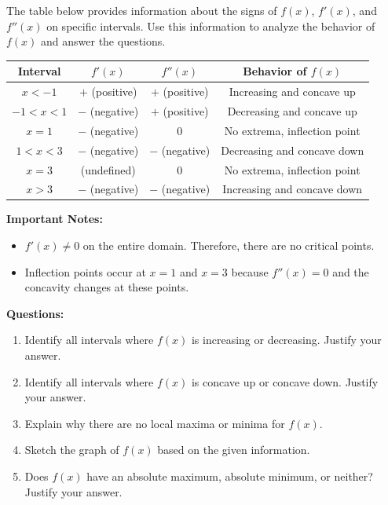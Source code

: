 \documentclass{article}
\begin{document}
\begin{tcolorbox}[colback=blue!10, colframe=blue!50!black, title=AP Calculus Problem]
The table below provides information about the signs of \(f(x)\), \(f'(x)\), and \(f''(x)\) on specific intervals. Use this information to analyze the behavior of \(f(x)\) and answer the questions.

\begin{center}
\begin{tabular}{|c|c|c|c|}
\hline
Interval & \(f'(x)\) & \(f''(x)\) & Behavior of \(f(x)\) \\
\hline
\(x < -1\) & \(+\) (positive) & \(+\) (positive) & Increasing and concave up \\
\(-1 < x < 1\) & \(-\) (negative) & \(+\) (positive) & Decreasing and concave up \\
\(x = 1\) & \(-\) (negative) & \(0\) & No extrema, inflection point \\
\(1 < x < 3\) & \(-\) (negative) & \(-\) (negative) & Decreasing and concave down \\
\(x = 3\) &  (undefined) & \(0\) & No extrema, inflection point \\
\(x > 3\) & \(-\) (negative) & \(-\) (negative) & Increasing and concave down \\
\hline
\end{tabular}
\end{center}

\textbf{Important Notes:}
\begin{itemize}
    \item \(f'(x) \neq 0\) on the entire domain. Therefore, there are no critical points.
    \item Inflection points occur at \(x = 1\) and \(x = 3\) because \(f''(x) = 0\) and the concavity changes at these points.
\end{itemize}

\textbf{Questions:}
\begin{enumerate}
    \item Identify all intervals where \(f(x)\) is increasing or decreasing. Justify your answer.
    \item Identify all intervals where \(f(x)\) is concave up or concave down. Justify your answer.
    \item Explain why there are no local maxima or minima for \(f(x)\).
    \item Sketch the graph of \(f(x)\) based on the given information.
    \item Does \(f(x)\) have an absolute maximum, absolute minimum, or neither? Justify your answer.
\end{enumerate}
\end{tcolorbox}
\end{document}
